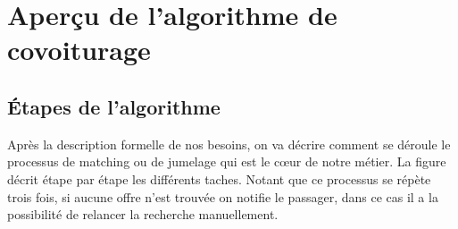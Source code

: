 \section{Aperçu de l'algorithme de covoiturage} %
\label{sec:Aperçu de l'algorithme de covoiturage}
\subsection{Étapes de l'algorithme} %
Après la description formelle de nos besoins, on va décrire comment se déroule le processus de matching ou de jumelage qui est le cœur de notre métier.
\newline
La figure  décrit étape par étape les différents taches. Notant que ce processus se répète trois fois, si aucune offre n'est trouvée on notifie le passager, dans ce cas il a la possibilité de relancer la recherche manuellement.


